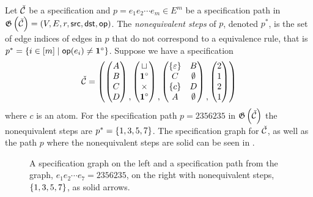 Let $\check{\mathcal{C}}$ be a specification and $p=e_1e_2\dotsm e_m \in E^m$ be a specification path in $\mathfrak{G}\left(\check{\mathcal{C}}\right) = (V,E,r,\textsf{src}, \textsf{dst}, \textsf{op})$. The \emph{nonequivalent steps} of $p$, denoted $p^\ast$, is the set of edge indices of edges in $p$ that do not correspond to a equivalence rule, that is $p^\ast = \left\{i\in[m] \mid \textsf{op}(e_i) \neq \mathbf{1}^\circ\right\}$. Suppose we have a specification  
\[
    \check{\mathcal{C}} = \left(\begin{pmatrix}A\\B\\C\\D\end{pmatrix}\begin{matrix}\\\\\\,\end{matrix} \begin{pmatrix}\sqcup\\ \mathbf{1}^\circ\\ \times\\ \mathbf{1}^\circ\end{pmatrix}\begin{matrix}\\\\\\,\end{matrix}\begin{pmatrix} \left\{\varepsilon\right\} & B \\ C & \emptyset \\ \left\{c\right\} & D \\ A & \emptyset\end{pmatrix}\begin{matrix}\\\\\\,\end{matrix}\begin{pmatrix}2\\1\\2\\1\end{pmatrix}\right)
\]
where $c$ is an atom. For the specification path $p = 2356235$ in $\mathfrak{G}\left(\check{\mathcal{C}}\right)$ the nonequivalent steps are $p^\ast = \left\{1,3,5,7\right\}$. The specification graph for $\check{\mathcal{C}}$, as well as the path $p$ where the nonequivalent steps are solid can be seen in . 
\begin{figure}[ht!]
    \centering
    
    \caption{A specification graph on the left and a specification path from the graph, $e_1e_2\dotsm e_7=2356235$, on the right with nonequivalent steps, $\left\{1,3,5,7\right\}$, as solid arrows.}
    \label{fig:noneqsteps}
\end{figure}

